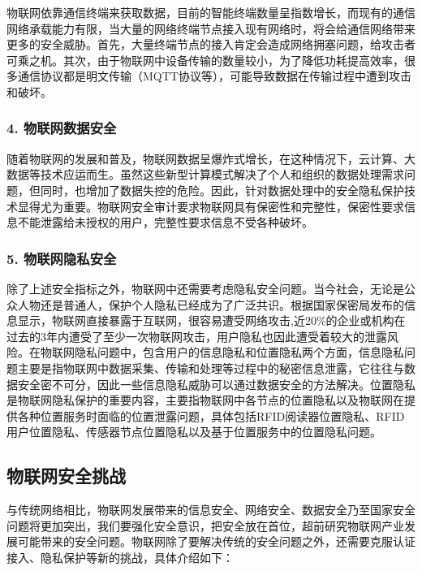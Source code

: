 物联网依靠通信终端来获取数据，目前的智能终端数量呈指数增长，而现有的通信网络承载能力有限，当大量的网络终端节点接入现有网络时，将会给通信网络带来更多的安全威胁。首先，大量终端节点的接入肯定会造成网络拥塞问题，给攻击者可乘之机。其次，由于物联网中设备传输的数量较小，为了降低功耗提高效率，很多通信协议都是明文传输（MQTT协议等），可能导致数据在传输过程中遭到攻击和破坏。

\subsubsection{\textcolor{myblue}{\textbf{4. 物联网数据安全 }}}

随着物联网的发展和普及，物联网数据呈爆炸式增长，在这种情况下，云计算、大数据等技术应运而生。虽然这些新型计算模式解决了个人和组织的数据处理需求问题，但同时，也增加了数据失控的危险。因此，针对数据处理中的安全隐私保护技术显得尤为重要。物联网安全审计要求物联网具有保密性和完整性，保密性要求信息不能泄露给未授权的用户，完整性要求信息不受各种破坏。

\subsubsection{\textcolor{myblue}{\textbf{5. 物联网隐私安全 }}}

除了上述安全指标之外，物联网中还需要考虑隐私安全问题。当今社会，无论是公众人物还是普通人，保护个人隐私已经成为了广泛共识。根据国家保密局发布的信息显示，物联网直接暴露于互联网，很容易遭受网络攻击,近20\%的企业或机构在过去的3年内遭受了至少一次物联网攻击，用户隐私也因此遭受着较大的泄露风险。在物联网隐私问题中，包含用户的信息隐私和位置隐私两个方面，信息隐私问题主要是指物联网中数据采集、传输和处理等过程中的秘密信息泄露，它往往与数据安全密不可分，因此一些信息隐私威胁可以通过数据安全的方法解决。位置隐私是物联网隐私保护的重要内容，主要指物联网中各节点的位置隐私以及物联网在提供各种位置服务时面临的位置泄露问题，具体包括RFID阅读器位置隐私、RFID用户位置隐私、传感器节点位置隐私以及基于位置服务中的位置隐私问题。


\subsection{物联网安全挑战}
\label{computer}

与传统网络相比，物联网发展带来的信息安全、网络安全、数据安全乃至国家安全问题将更加突出，我们要强化安全意识，把安全放在首位，超前研究物联网产业发展可能带来的安全问题。物联网除了要解决传统的安全问题之外，还需要克服认证接入、隐私保护等新的挑战，具体介绍如下：

